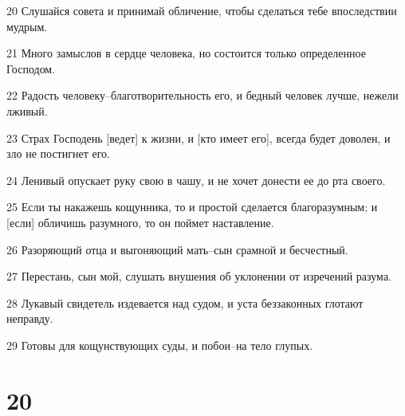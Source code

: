 \par 20 Слушайся совета и принимай обличение, чтобы сделаться тебе впоследствии мудрым.
\par 21 Много замыслов в сердце человека, но состоится только определенное Господом.
\par 22 Радость человеку--благотворительность его, и бедный человек лучше, нежели лживый.
\par 23 Страх Господень [ведет] к жизни, и [кто имеет его], всегда будет доволен, и зло не постигнет его.
\par 24 Ленивый опускает руку свою в чашу, и не хочет донести ее до рта своего.
\par 25 Если ты накажешь кощунника, то и простой сделается благоразумным; и [если] обличишь разумного, то он поймет наставление.
\par 26 Разоряющий отца и выгоняющий мать--сын срамной и бесчестный.
\par 27 Перестань, сын мой, слушать внушения об уклонении от изречений разума.
\par 28 Лукавый свидетель издевается над судом, и уста беззаконных глотают неправду.
\par 29 Готовы для кощунствующих суды, и побои--на тело глупых.

\chapter{20}

